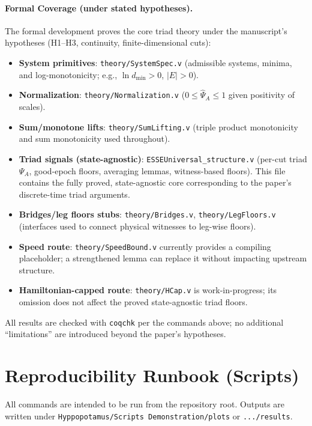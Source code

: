 \documentclass[10pt]{article}
\begin{document}
\paragraph{Formal Coverage (under stated hypotheses).}
The formal development proves the core triad theory under the manuscript's hypotheses (H1--H3, continuity, finite-dimensional cuts):
\begin{itemize}
  \item \textbf{System primitives}: \texttt{theory/SystemSpec.v} (admissible systems, minima, and log-monotonicity; e.g., \(\ln d_{\min}>0\), \(|E|>0\)).
  \item \textbf{Normalization}: \texttt{theory/Normalization.v} (\(0\le\widehat{\Psi}_A\le 1\) given positivity of scales).
  \item \textbf{Sum/monotone lifts}: \texttt{theory/SumLifting.v} (triple product monotonicity and sum monotonicity used throughout).
  \item \textbf{Triad signals (state-agnostic)}: \texttt{ESSEUniversal\_structure.v} (per-cut triad \(\Psi_A\), good-epoch floors, averaging lemmas, witness-based floors). This file contains the fully proved, state-agnostic core corresponding to the paper’s discrete-time triad arguments.
  \item \textbf{Bridges/leg floors stubs}: \texttt{theory/Bridges.v}, \texttt{theory/LegFloors.v} (interfaces used to connect physical witnesses to leg-wise floors).
  \item \textbf{Speed route}: \texttt{theory/SpeedBound.v} currently provides a compiling placeholder; a strengthened lemma can replace it without impacting upstream structure.
  \item \textbf{Hamiltonian-capped route}: \texttt{theory/HCap.v} is work-in-progress; its omission does not affect the proved state-agnostic triad floors.
\end{itemize}
All results are checked with \verb|coqchk| per the commands above; no additional “limitations” are introduced beyond the paper’s hypotheses.

\section{Reproducibility Runbook (Scripts)}

All commands are intended to be run from the repository root. Outputs are written under \texttt{Hyppopotamus/Scripts Demonstration/plots} or \texttt{.../results}.
\end{document}
